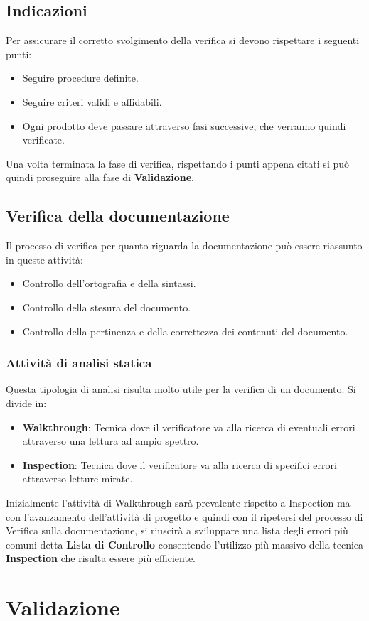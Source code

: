 \subsection{Indicazioni}
Per assicurare il corretto svolgimento della verifica si devono rispettare i seguenti punti:
\begin{itemize}
  \item Seguire procedure definite.
  \item Seguire criteri validi e affidabili.
  \item Ogni prodotto deve passare attraverso fasi successive, che verranno quindi verificate.
\end{itemize}
Una volta terminata la fase di verifica, rispettando i punti appena citati si può quindi proseguire alla fase di \textbf{Validazione}.

\subsection{Verifica della documentazione}
Il processo di verifica per quanto riguarda la documentazione può essere riassunto in queste attività:
\begin{itemize}
  \item Controllo dell'ortografia e della sintassi.
  \item Controllo della stesura del documento.
  \item Controllo della pertinenza e della correttezza dei contenuti del documento.
\end{itemize}

\subsubsection{Attività di analisi statica}
Questa tipologia di analisi risulta molto utile per la verifica di un documento. Si divide in:
\begin{itemize}
  \item \textbf{Walkthrough}: Tecnica dove il verificatore va alla ricerca di eventuali errori attraverso una lettura ad ampio spettro.
  \item \textbf{Inspection}: Tecnica dove il verificatore va alla ricerca di specifici errori attraverso letture mirate.
\end{itemize}
Inizialmente l'attività di Walkthrough sarà prevalente rispetto a Inspection ma
con l'avanzamento dell'attività di progetto e quindi con il ripetersi del processo di Verifica sulla documentazione, si riuscirà a sviluppare una lista degli errori più comuni detta \textbf{Lista di Controllo} consentendo l'utilizzo più massivo della tecnica \textbf{Inspection} che risulta essere più efficiente.

\section{Validazione}
